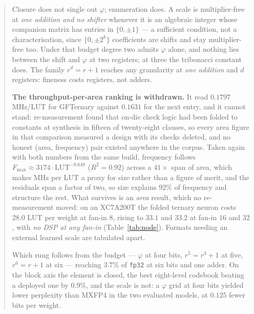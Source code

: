 \documentclass[11pt]{article}
\theoremstyle{definition}
\begin{document}
\begin{abstract}
Closure does not single out $\varphi$; enumeration does. A scale is
multiplier-free at \emph{one addition and no shifter} whenever it is an
algebraic integer whose companion matrix has entries in $\{0,\pm1\}$ --- a
sufficient condition, not a characterisation, since $\{0,\pm2^k\}$ coefficients
are shifts and stay multiplier-free too. Under that budget degree two admits
$\varphi$ alone, and nothing lies between the shift and $\varphi$ at two
registers; at three the tribonacci constant does. The family $r^d=r+1$ reaches
any granularity at \emph{one addition} and $d$ registers: fineness costs
registers, not adders.

\textbf{The throughput-per-area ranking is withdrawn.} It read
$0.1797$\,MHz/LUT for GFTernary against $0.1631$ for the next entry, and it
cannot stand: re-measurement found that on-die check logic had been folded to
constants at synthesis in fifteen of twenty-eight clauses, so every area figure
in that comparison measured a design with its checks deleted, and no honest
(area, frequency) pair existed anywhere in the corpus. Taken again with both
numbers from the same build, frequency follows
$F_{\max}\approx 3174\cdot\mathrm{LUT}^{-0.648}$ ($R^2=0.92$) across a
$41\times$ span of area, which makes MHz per LUT a proxy for size rather than a
figure of merit, and the residuals span a factor of two, so size explains $92\%$
of frequency and structure the rest. What survives is an \emph{area} result,
which no re-measurement moved: on an XC7A200T the folded ternary neuron costs
$28.0$ LUT per weight at fan-in $8$, rising to $33.1$ and $33.2$ at fan-in $16$
and $32$, with \emph{no DSP at any fan-in} (Table~\ref{tab:node}). Formats
needing an external learned scale are tabulated apart.

Which rung follows from the budget --- $\varphi$ at four bits, $r^5{=}r^3{+}1$ at
five, $r^6{=}r{+}1$ at six --- reaching $3.7\%$ of \texttt{fp32} at six bits and
one adder. On the block axis the element is closed, the best eight-level
codebook beating a deployed one by $0.9\%$, and the scale is not: a $\varphi$
grid at four bits yielded lower perplexity than MXFP4 in the two evaluated models,
at $0.125$ fewer bits per weight.


\end{abstract}
\end{document}
